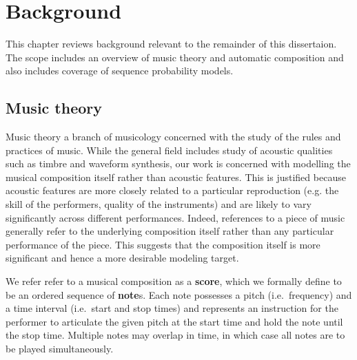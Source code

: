 \chapter{Background}



This chapter reviews background relevant to the remainder of this dissertaion.
The scope includes an overview of music theory and automatic composition
and also includes coverage of sequence probability models.

\section{Music theory}

Music theory a branch of musicology concerned with the study of the rules and
practices of music. While the general field includes study of acoustic
qualities such as timbre and waveform synthesis, our work is concerned with
modelling the musical composition itself rather than acoustic features. This is
justified because acoustic features are more closely related to a particular
reproduction (e.g. the skill of the performers, quality of the instruments)
and are likely to vary significantly across different performances. Indeed,
references to a piece of music generally refer to the underlying composition
itself rather than any particular performance of the piece. This suggests
that the composition itself is more significant and hence a more desirable
modeling target.

We refer refer to a musical composition as a \textbf{score}, which we formally
define to be an ordered sequence of \textbf{note}s. Each note possesses a pitch
(i.e.\ frequency) and a time interval (i.e.\ start and stop times) and
represents an instruction for the performer to articulate the given pitch at
the start time and hold the note until the stop time. Multiple notes may
overlap in time, in which case all notes are to be played simultaneously.

